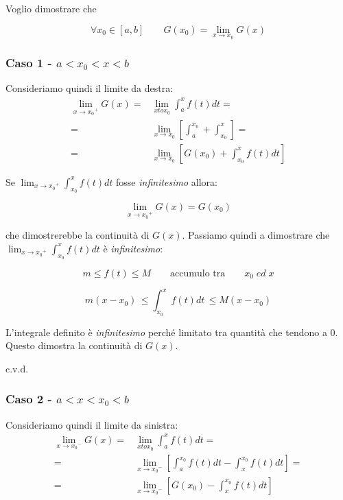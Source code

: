 \documentclass[../dimostrazioni]{subfiles}
\begin{document}
                Voglio dimostrare che 

                \[\forall x_0 \in [a, b] \qquad G(x_0) = \lim_{x \to  x_0} G(x) \]
            
                \subsubsection*{Caso 1 - \(a < x_0 < x < b \)}
                    Consideriamo quindi il limite da destra:
                    \begin{align*}
                        \lim_{x \to {x_0}^{+}}G(x) =& \lim_{x to x_0}{\int_{a}^{x}f(t) dt} = \\
                        =& \lim_{x \to x_0} \left[ \int_{a}^{x_0} + \int_{x_0}^{x} \right] = \\
                        =& \lim_{x \to x_0} \left[ G(x_0) + \int_{x_0}^{x} f(t) dt \right]
                    \end{align*}

                    Se \( \lim_{x \to {x_0}^{+}} \int_{x_0}^{x} f(t) dt \) fosse \emph{infinitesimo} allora:

                    \[  \lim_{x \to {x_0}^{+}}G(x) = G(x_0) \]

                    che dimostrerebbe la continuità di \(G(x)\). Passiamo quindi a dimostrare che \( \lim_{x \to {x_0}^{+}} \int_{x_0}^{x} f(t) dt \) è \emph{infinitesimo}:

                    \[m \leqslant f(t) \leqslant M \qquad \text {accumulo tra} \qquad x_0 \; ed \; x \]

                    \[m(x-x_0) \, \leqslant \int_{x_0}^{x} f(t) dt \, \leqslant M(x-x_0) \]

                    L'integrale definito è \emph{infinitesimo} perché limitato tra quantità che tendono a 0. Questo dimostra la continuità di \(G(x)\).

                    c.v.d.
                
                \subsubsection*{Caso 2 - \(a < x < x_0 < b \)}
                    Consideriamo quindi il limite da sinistra:
                    \begin{align*}
                        \lim_{x \to {x_0}^{-}}G(x) =& \lim_{x to x_0}{\int_{a}^{x}f(t) dt} = \\
                        =& \lim_{x \to {x_0}^{-}} \left[ \int_{a}^{x_0}f(t) dt - \int_{x}^{x_0}f(t) dt \right] = \\
                        =& \lim_{x \to {x_0}^{-}} \left[ G(x_0) - \int_{x}^{x_0} f(t) dt \right]
                    \end{align*}
\end{document}
